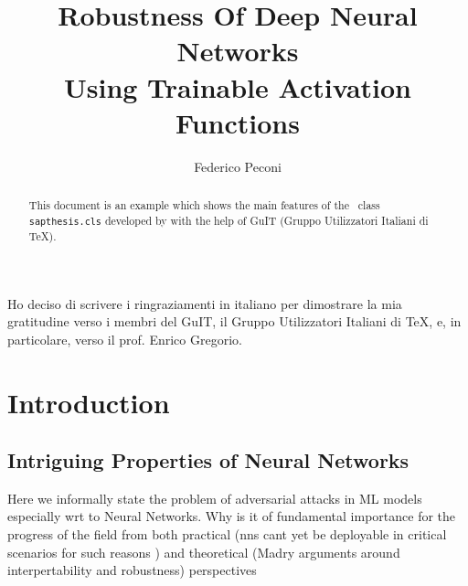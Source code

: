 \documentclass[LaM,binding=0.6cm]{./packages/sapthesis/sapthesis}
\title{Robustness Of Deep Neural Networks \\Using Trainable Activation Functions}
\author{Federico Peconi}
\begin{document}
\frontmatter

\maketitle
\dedication{Dedicated to\\ Donald Knuth}

\begin{abstract}
This document is an example which shows the main features of
the \LaTeXe\ class \texttt{sapthesis.cls} developed by 
with the help of GuIT (Gruppo Utilizzatori Italiani di \TeX).
\end{abstract}

\begin{acknowledgments}
Ho deciso di scrivere i ringraziamenti in italiano
per dimostrare la mia gratitudine verso i membri
del GuIT, il Gruppo Utilizzatori Italiani di \TeX, e, in particolare,
verso il prof. Enrico Gregorio.
\end{acknowledgments}

\tableofcontents


\mainmatter

\chapter{Introduction}

    \section{Intriguing Properties of Neural Networks}

        Here we informally state the problem of adversarial attacks in ML models 
        especially wrt to Neural Networks.
        Why is it of fundamental importance for the progress of the field from
        both practical (nns cant yet be deployable in critical scenarios for such reasons ) 
        and theoretical (Madry arguments around interpertability and robustness)
        perspectives
\end{document}
